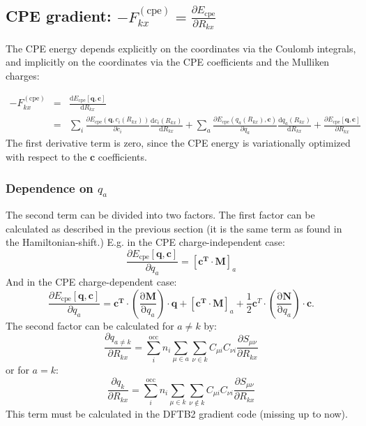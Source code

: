\documentclass{article}
\numberwithin{equation}{section}
\begin{document}
\subsection{CPE gradient: $-F_{kx}^\mathrm{(cpe)} = \frac{\partial E_\mathrm{cpe}}{\partial R_{kx}}$}
The CPE energy depends explicitly on the coordinates via the Coulomb integrals, and implicitly on the coordinates via the CPE coefficients and the Mulliken charges:

\begin{eqnarray}
-F_{kx}^\mathrm{(cpe)} &=& \frac{\mathrm{d} E_\mathrm{{cpe}}\left[\mathbf{q}, \mathbf{c}\right]}{\mathrm{d} R_{kx}} \nonumber\\
    &=& \sum_i \frac{\partial E_\mathrm{{cpe}}\left(\mathbf{q}, c_{i}(R_{kx})\right)}{\partial c_{i}}    
    \frac{\mathrm{d} c_{i}(R_{kx})}{\mathrm{d} R_{kx}} 
    + \sum_a \frac{\partial E_\mathrm{{cpe}}\left(q_a(R_{kx}), \mathbf{c}\right)}{\partial q_a}    
    \frac{\mathrm{d} q_a(R_{kx})}{\mathrm{d} R_{kx}} 
    + \frac{\partial E_\mathrm{{cpe}}\left[\mathbf{q}, \mathbf{c}\right]}{\partial R_{kx}}
\end{eqnarray}
The first derivative term is zero, since the CPE energy is variationally optimized with respect to the $\mathbf{c}$ coefficients. 
\subsubsection{Dependence on $q_a$}
The second term can be divided into two factors. The first factor can be calculated as described in the previous section (it is the same term as found in the Hamiltonian-shift.) 
E.g. in the CPE charge-independent case:
\begin{equation}
    \frac{\partial E_{\mathrm{cpe}}\left[\mathbf{q}, \mathbf{c}\right]}{\partial q_a} = [\mathbf{c^T}  \cdot \mathbf{M}]_a
\end{equation}
And in the CPE charge-dependent case:
\begin{equation}
    \frac{\partial E_{\mathrm{cpe}}\left[\mathbf{q}, \mathbf{c}\right]}{\partial q_a} = 
    \mathbf{c^T} \cdot \left( \frac{\mathrm{\partial}\mathbf{M}}{\mathrm{\partial}q_a}\right) \cdot \mathbf{q} 
    + [\mathbf{c^T}  \cdot \mathbf{M}]_a + \frac{1}{2}\mathbf{c}^T \cdot \left( \frac{\mathrm{\partial}\mathbf{N}}{\mathrm{\partial}q_a}\right) \cdot \mathbf{c}. 
\end{equation}
The second factor can be calculated for $a \neq k$ by:\cite{dftb3}
\begin{equation}
    \frac{\partial q_{a\neq k}}{\partial R_{kx}} 
    = \sum_i^\mathrm{occ} n_i \sum_{\mu \in a} \sum_{\nu \in k}  C_{\mu i} C_{\nu i}\frac{\partial S_{\mu\nu}}{\partial R_{kx}}
\end{equation}
or for $a=k$:
\begin{equation}
    \frac{\partial q_{k}}{\partial R_{kx}} 
    = \sum_i^\mathrm{occ} n_i \sum_{\mu \in k} \sum_{\nu \not\in k}  C_{\mu i} C_{\nu i}\frac{\partial S_{\mu\nu}}{\partial R_{kx}}
\end{equation}
This term must be calculated in the DFTB2 gradient code (missing up to now). 
\end{document}
